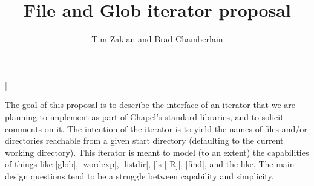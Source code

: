 \documentclass{article}
\title{File and Glob iterator proposal}
\author{Tim Zakian and Brad Chamberlain}
\begin{document}
\maketitle
\lstMakeShortInline[]|

\noindent The goal of this proposal is to describe the interface of an
iterator that we are planning to implement as part of Chapel's
standard libraries, and to solicit comments on it.  The intention of
the iterator is to yield the names of files and/or directories
reachable from a given start directory (defaulting to the current
working directory).  This iterator is meant to model (to an extent)
the capabilities of things like |glob|, |wordexp|, |listdir|, |ls [-R]|, 
|find|, and the like.  The main design questions tend to be a
struggle between capability and simplicity.


\end{document}
